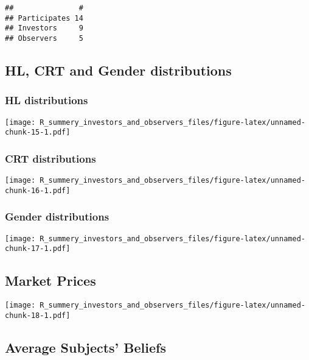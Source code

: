\documentclass[]{article}
\begin{document}
\begin{verbatim}
##               #
## Participates 14
## Investors     9
## Observers     5
\end{verbatim}

\hypertarget{hl-crt-and-gender-distributions-1}{%
\subsection{HL, CRT and Gender
distributions}\label{hl-crt-and-gender-distributions-1}}

\hypertarget{hl-distributions-1}{%
\subsubsection{HL distributions}\label{hl-distributions-1}}

\texttt{[image: R\_summery\_investors\_and\_observers\_files/figure-latex/unnamed-chunk-15-1.pdf]}

\hypertarget{crt-distributions-1}{%
\subsubsection{CRT distributions}\label{crt-distributions-1}}

\texttt{[image: R\_summery\_investors\_and\_observers\_files/figure-latex/unnamed-chunk-16-1.pdf]}

\hypertarget{gender-distributions-1}{%
\subsubsection{Gender distributions}\label{gender-distributions-1}}

\texttt{[image: R\_summery\_investors\_and\_observers\_files/figure-latex/unnamed-chunk-17-1.pdf]}

\hypertarget{market-prices-1}{%
\subsection{Market Prices}\label{market-prices-1}}

\texttt{[image: R\_summery\_investors\_and\_observers\_files/figure-latex/unnamed-chunk-18-1.pdf]}

\hypertarget{average-subjects-beliefs-1}{%
\subsection{Average Subjects'
Beliefs}\label{average-subjects-beliefs-1}}
\end{document}
